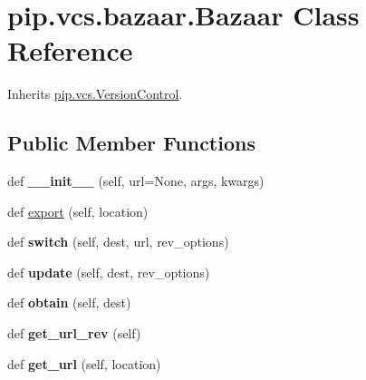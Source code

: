 \hypertarget{classpip_1_1vcs_1_1bazaar_1_1_bazaar}{}\section{pip.\+vcs.\+bazaar.\+Bazaar Class Reference}
\label{classpip_1_1vcs_1_1bazaar_1_1_bazaar}


Inherits \hyperlink{classpip_1_1vcs_1_1_version_control}{pip.\+vcs.\+Version\+Control}.

\subsection*{Public Member Functions}
\begin{DoxyCompactItemize}
\item 
\mbox{\label{classpip_1_1vcs_1_1bazaar_1_1_bazaar_af7397a85004c529ac5d81b97a60cf7e3}} 
def {\bfseries \+\_\+\+\_\+init\+\_\+\+\_\+} (self, url=None, args, kwargs)
\item 
def \hyperlink{classpip_1_1vcs_1_1bazaar_1_1_bazaar_ada58f106fcf29da984e45a3e4e4d9057}{export} (self, location)
\item 
\mbox{\label{classpip_1_1vcs_1_1bazaar_1_1_bazaar_aa7be3e9842058d42787484690f1537bf}} 
def {\bfseries switch} (self, dest, url, rev\+\_\+options)
\item 
\mbox{\label{classpip_1_1vcs_1_1bazaar_1_1_bazaar_a50e61cac4dcb86519e71b72c4b2cd647}} 
def {\bfseries update} (self, dest, rev\+\_\+options)
\item 
\mbox{\label{classpip_1_1vcs_1_1bazaar_1_1_bazaar_acefba6103c07df2db48c1058c3cf6c9d}} 
def {\bfseries obtain} (self, dest)
\item 
\mbox{\label{classpip_1_1vcs_1_1bazaar_1_1_bazaar_a04732cb0b1dfe1009d540673e07c8a9d}} 
def {\bfseries get\+\_\+url\+\_\+rev} (self)
\item 
\mbox{\label{classpip_1_1vcs_1_1bazaar_1_1_bazaar_a5d7ddd537058a2ff73e37ecb20421532}} 
def {\bfseries get\+\_\+url} (self, location)
\item 

\end{DoxyCompactItemize}
